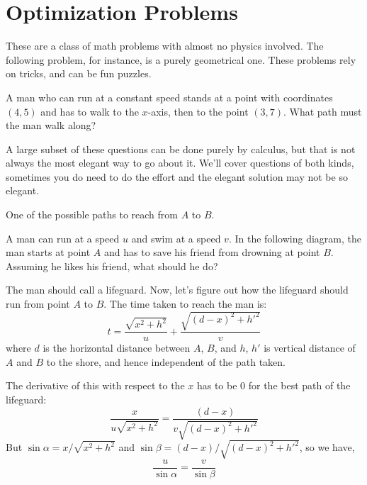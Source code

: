 \section{Optimization Problems}
    These are a class of math problems with almost no physics involved. The following problem, for instance, is a purely
    geometrical one. These problems rely on tricks, and can be fun puzzles.
    \begin{question}
        A man who can run at a constant speed stands at a point with coordinates $(4, 5)$ and has to walk to the $x$-axis, then to the point $(3, 7)$. What path must the man walk along?
    \end{question}

    A large subset of these questions can be done purely by calculus, but that is not always the most elegant way to go 
    about it. We'll cover questions of both kinds, sometimes you do need to do the effort and the elegant solution
    may not be so elegant.
        
    \begin{marginfigure}
        \vspace{20em}
        \hspace*{-1.5em}
        \caption{One of the possible paths to reach from $A$ to $B$.} 
    \end{marginfigure}

    \begin{example}
        A man can run at a speed $u$ and swim at a speed $v$. In the following diagram, 
        the man starts at point $A$ and has to save his friend from drowning at point $B$. 
        Assuming he likes his friend, what should he do? 

        \begin{soln}
            The man should call a lifeguard. Now, let's figure out how the lifeguard should run from point $A$ to $B$.
            The time taken to reach the man is: 
            \[
                t = \frac{\sqrt{x^2 + h^2}}{u} + \frac{\sqrt{(d-x)^2 + h'^2}}{v}
            \]
            where $d$ is the horizontal distance between $A$, $B$, and $h$, $h'$ is vertical 
            distance of $A$ and $B$ to the shore, and hence independent of the path taken.

            The derivative of this with respect to the $x$ has to be $0$ for the best path of the lifeguard:
            \[
                \frac{x}{u\sqrt{x^2 + h^2}} = \frac{(d-x)}{v\sqrt{(d-x)^2 + h'^2}}
            \]
            But $\sin\alpha = x/\sqrt{x^2 + h^2}$ and $\sin\beta = (d-x)/\sqrt{(d-x)^2 + h'^2}$, so we have,
            \begin{equation}
            \boxed{\frac{u}{\sin\alpha} = \frac{v}{\sin\beta}}
            \end{equation}
        \end{soln}
    \end{example}


